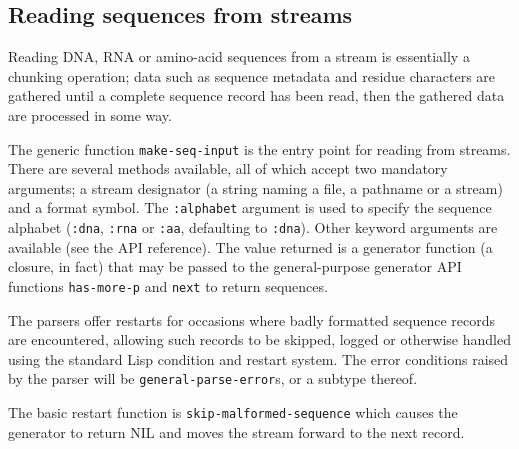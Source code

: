 \documentclass[a4paper, 12pt]{article}
\begin{document}
\subsection{Reading sequences from streams}
\label{sec:read-bioseq-stream}

Reading DNA, RNA or amino-acid sequences from a stream is essentially
a chunking operation; data such as sequence metadata and residue
characters are gathered until a complete sequence record has been
read, then the gathered data are processed in some way.

The generic function \lstinline!make-seq-input! is the entry point for
reading from streams. There are several methods available, all of
which accept two mandatory arguments; a stream designator (a string
naming a file, a pathname or a stream) and a format symbol. The
\lstinline!:alphabet! argument is used to specify the sequence
alphabet (\lstinline!:dna!, \lstinline!:rna! or \lstinline!:aa!,
defaulting to \lstinline!:dna!). Other keyword arguments are available
(see the API reference). The value returned is a generator function (a
closure, in fact) that may be passed to the general-purpose generator
API functions \lstinline!has-more-p! and \lstinline!next! to return
sequences.

The parsers offer restarts for occasions where badly formatted
sequence records are encountered, allowing such records to be skipped,
logged or otherwise handled using the standard Lisp condition and
restart system. The error conditions raised by the parser will be
\lstinline!general-parse-error!s, or a subtype thereof.

The basic restart function is \lstinline!skip-malformed-sequence!
which causes the generator to return NIL and moves the stream forward
to the next record.
\end{document}

